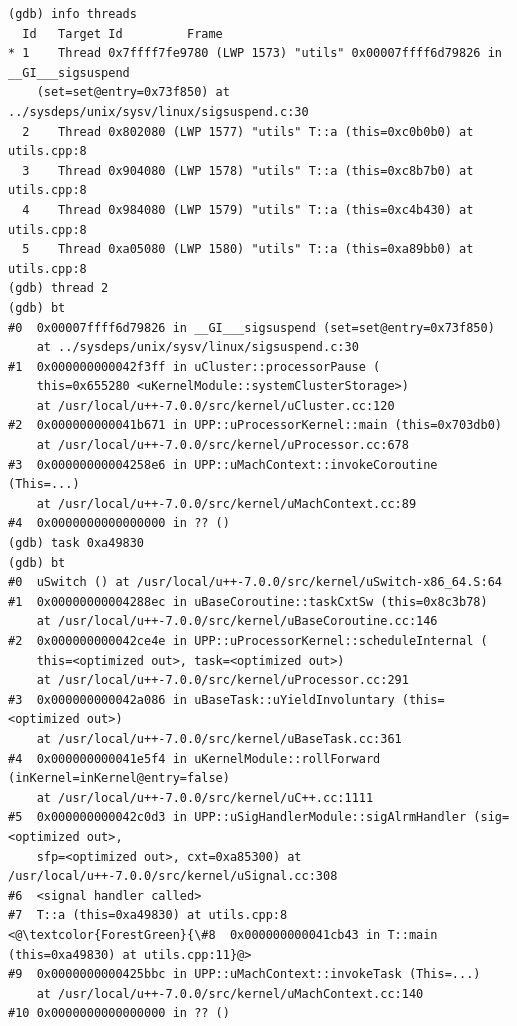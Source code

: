 \begin{lstlisting}[caption={task <task\_address> command}, label={pushtask}]
(gdb) info threads
  Id   Target Id         Frame
* 1    Thread 0x7ffff7fe9780 (LWP 1573) "utils" 0x00007ffff6d79826 in __GI___sigsuspend
    (set=set@entry=0x73f850) at ../sysdeps/unix/sysv/linux/sigsuspend.c:30
  2    Thread 0x802080 (LWP 1577) "utils" T::a (this=0xc0b0b0) at utils.cpp:8
  3    Thread 0x904080 (LWP 1578) "utils" T::a (this=0xc8b7b0) at utils.cpp:8
  4    Thread 0x984080 (LWP 1579) "utils" T::a (this=0xc4b430) at utils.cpp:8
  5    Thread 0xa05080 (LWP 1580) "utils" T::a (this=0xa89bb0) at utils.cpp:8
(gdb) thread 2
(gdb) bt
#0  0x00007ffff6d79826 in __GI___sigsuspend (set=set@entry=0x73f850)
    at ../sysdeps/unix/sysv/linux/sigsuspend.c:30
#1  0x000000000042f3ff in uCluster::processorPause (
    this=0x655280 <uKernelModule::systemClusterStorage>)
    at /usr/local/u++-7.0.0/src/kernel/uCluster.cc:120
#2  0x000000000041b671 in UPP::uProcessorKernel::main (this=0x703db0)
    at /usr/local/u++-7.0.0/src/kernel/uProcessor.cc:678
#3  0x00000000004258e6 in UPP::uMachContext::invokeCoroutine (This=...)
    at /usr/local/u++-7.0.0/src/kernel/uMachContext.cc:89
#4  0x0000000000000000 in ?? ()
(gdb) task 0xa49830
(gdb) bt
#0  uSwitch () at /usr/local/u++-7.0.0/src/kernel/uSwitch-x86_64.S:64
#1  0x00000000004288ec in uBaseCoroutine::taskCxtSw (this=0x8c3b78)
    at /usr/local/u++-7.0.0/src/kernel/uBaseCoroutine.cc:146
#2  0x000000000042ce4e in UPP::uProcessorKernel::scheduleInternal (
    this=<optimized out>, task=<optimized out>)
    at /usr/local/u++-7.0.0/src/kernel/uProcessor.cc:291
#3  0x000000000042a086 in uBaseTask::uYieldInvoluntary (this=<optimized out>)
    at /usr/local/u++-7.0.0/src/kernel/uBaseTask.cc:361
#4  0x000000000041e5f4 in uKernelModule::rollForward (inKernel=inKernel@entry=false)
    at /usr/local/u++-7.0.0/src/kernel/uC++.cc:1111
#5  0x000000000042c0d3 in UPP::uSigHandlerModule::sigAlrmHandler (sig=<optimized out>,
    sfp=<optimized out>, cxt=0xa85300) at /usr/local/u++-7.0.0/src/kernel/uSignal.cc:308
#6  <signal handler called>
#7  T::a (this=0xa49830) at utils.cpp:8
<@\textcolor{ForestGreen}{\#8  0x000000000041cb43 in T::main (this=0xa49830) at utils.cpp:11}@>
#9  0x0000000000425bbc in UPP::uMachContext::invokeTask (This=...)
    at /usr/local/u++-7.0.0/src/kernel/uMachContext.cc:140
#10 0x0000000000000000 in ?? ()
\end{lstlisting}


